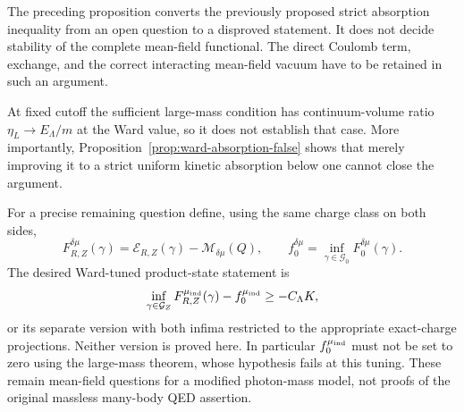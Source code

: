 \begin{remark}
\label{rem:mf-photon-open}
The preceding proposition converts the previously proposed strict
absorption inequality from an open question to a disproved statement.
It does not decide stability of the complete mean-field functional.
The direct Coulomb term, exchange, and the correct interacting mean-field
vacuum have to be retained in such an argument.

At fixed cutoff the sufficient large-mass condition has continuum-volume
ratio $\eta_L\to E_\Lambda/m$ at the Ward value, so it does not establish
that case.  More importantly, Proposition~\ref{prop:ward-absorption-false}
shows that merely improving it to a strict uniform kinetic absorption
below one cannot close the argument.

For a precise remaining question define, using the same charge class on
both sides,
\[
 F_{R,Z}^{\delta\mu}(\gamma)
 =\mathcal E_{R,Z}(\gamma)-\mathcal M_{\delta\mu}(Q),
 \qquad
 f_0^{\delta\mu}=\inf_{\gamma\in\mathcal G_0}F_0^{\delta\mu}(\gamma).
\]
The desired Ward-tuned product-state statement is
\[
 \inf_{\gamma\in\mathcal G_Z}F_{R,Z}^{\mu_{\rm ind}}(\gamma)
       -f_0^{\mu_{\rm ind}}\ge-C_\Lambda K,
\]
or its separate version with both infima restricted to the appropriate
exact-charge projections.  Neither version is proved here.  In particular
$f_0^{\mu_{\rm ind}}$ must not be set to zero using the large-mass theorem,
whose hypothesis fails at this tuning.  These remain mean-field questions
for a modified photon-mass model, not proofs of the original massless
many-body QED assertion.
\end{remark}
